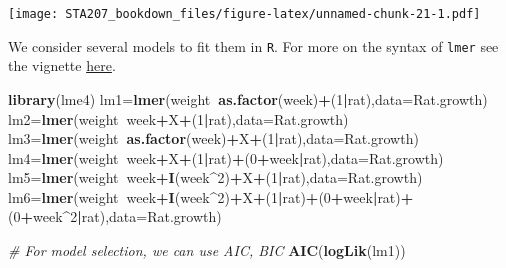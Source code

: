 \documentclass[12pt,]{book}
\newenvironment{Shaded}{\begin{snugshade}}{\end{snugshade}}
\newcommand{\KeywordTok}[1]{\textcolor[rgb]{0.13,0.29,0.53}{\textbf{#1}}}
\newcommand{\DataTypeTok}[1]{\textcolor[rgb]{0.13,0.29,0.53}{#1}}
\newcommand{\DecValTok}[1]{\textcolor[rgb]{0.00,0.00,0.81}{#1}}
\newcommand{\CommentTok}[1]{\textcolor[rgb]{0.56,0.35,0.01}{\textit{#1}}}
\newcommand{\OperatorTok}[1]{\textcolor[rgb]{0.81,0.36,0.00}{\textbf{#1}}}
\newcommand{\NormalTok}[1]{#1}
\begin{document}
\texttt{[image: STA207\_bookdown\_files/figure-latex/unnamed-chunk-21-1.pdf]}

We consider several models to fit them in \texttt{R}. For more on the
syntax of \texttt{lmer} see the vignette
\href{https://cran.r-project.org/web/packages/lme4/vignettes/lmer.pdf}{here}.

\begin{Shaded}
\begin{Highlighting}[]
\KeywordTok{library}\NormalTok{(lme4)}
\NormalTok{lm1=}\KeywordTok{lmer}\NormalTok{(weight}\OperatorTok{~}\KeywordTok{as.factor}\NormalTok{(week)}\OperatorTok{+}\NormalTok{(}\DecValTok{1}\OperatorTok{|}\NormalTok{rat),}\DataTypeTok{data=}\NormalTok{Rat.growth)}
\NormalTok{lm2=}\KeywordTok{lmer}\NormalTok{(weight}\OperatorTok{~}\NormalTok{week}\OperatorTok{+}\NormalTok{X}\OperatorTok{+}\NormalTok{(}\DecValTok{1}\OperatorTok{|}\NormalTok{rat),}\DataTypeTok{data=}\NormalTok{Rat.growth)}
\NormalTok{lm3=}\KeywordTok{lmer}\NormalTok{(weight}\OperatorTok{~}\KeywordTok{as.factor}\NormalTok{(week)}\OperatorTok{+}\NormalTok{X}\OperatorTok{+}\NormalTok{(}\DecValTok{1}\OperatorTok{|}\NormalTok{rat),}\DataTypeTok{data=}\NormalTok{Rat.growth)}
\NormalTok{lm4=}\KeywordTok{lmer}\NormalTok{(weight}\OperatorTok{~}\NormalTok{week}\OperatorTok{+}\NormalTok{X}\OperatorTok{+}\NormalTok{(}\DecValTok{1}\OperatorTok{|}\NormalTok{rat)}\OperatorTok{+}\NormalTok{(}\DecValTok{0}\OperatorTok{+}\NormalTok{week}\OperatorTok{|}\NormalTok{rat),}\DataTypeTok{data=}\NormalTok{Rat.growth)}
\NormalTok{lm5=}\KeywordTok{lmer}\NormalTok{(weight}\OperatorTok{~}\NormalTok{week}\OperatorTok{+}\KeywordTok{I}\NormalTok{(week}\OperatorTok{^}\DecValTok{2}\NormalTok{)}\OperatorTok{+}\NormalTok{X}\OperatorTok{+}\NormalTok{(}\DecValTok{1}\OperatorTok{|}\NormalTok{rat),}\DataTypeTok{data=}\NormalTok{Rat.growth)}
\NormalTok{lm6=}\KeywordTok{lmer}\NormalTok{(weight}\OperatorTok{~}\NormalTok{week}\OperatorTok{+}\KeywordTok{I}\NormalTok{(week}\OperatorTok{^}\DecValTok{2}\NormalTok{)}\OperatorTok{+}\NormalTok{X}\OperatorTok{+}\NormalTok{(}\DecValTok{1}\OperatorTok{|}\NormalTok{rat)}\OperatorTok{+}\NormalTok{(}\DecValTok{0}\OperatorTok{+}\NormalTok{week}\OperatorTok{|}\NormalTok{rat)}\OperatorTok{+}\NormalTok{(}\DecValTok{0}\OperatorTok{+}\NormalTok{week}\OperatorTok{^}\DecValTok{2}\OperatorTok{|}\NormalTok{rat),}\DataTypeTok{data=}\NormalTok{Rat.growth)}
\end{Highlighting}
\end{Shaded}

\begin{Shaded}
\begin{Highlighting}[]
\CommentTok{# For model selection, we can use AIC, BIC }
\KeywordTok{AIC}\NormalTok{(}\KeywordTok{logLik}\NormalTok{(lm1))}
\end{Highlighting}
\end{Shaded}
\end{document}
